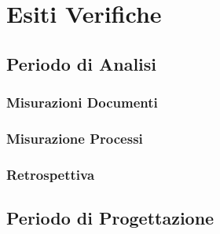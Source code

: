 \documentclass[a4paper, oneside, openany, dvipsnames, table]{article}
\begin{document}
% 	
% 		
% 			
% 			


\appendix
{}

\newpage
\section{Esiti Verifiche}


	\label{app:misure}
	\subsection{Periodo di Analisi}
		\subsubsection{Misurazioni Documenti}
			
		\subsubsection{Misurazione Processi}
			
		\subsubsection{Retrospettiva}
			
		
\newpage	
	\subsection{Periodo di Progettazione}
\end{document}
